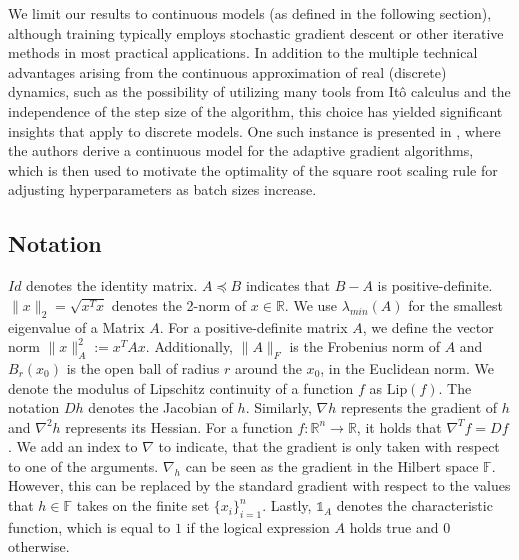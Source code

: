 \documentclass[10pt]{article} %
\newcommand{\R}{\mathbb{R}}
\newcommand{\bF}{\mathbb{F}}
\newcommand{\bR}{\mathbb{R}}
\begin{document}
We limit our results to continuous models (as defined in the following section), although training typically employs stochastic gradient descent or other iterative methods in most practical applications. In addition to the multiple technical advantages arising from the continuous approximation of real (discrete) dynamics, such as the possibility of utilizing many tools from Itô calculus and the independence of the step size of the algorithm, this choice has yielded significant insights that apply to discrete models. One such instance is presented in \citet{malladi2024sdesscalingrulesadaptive}, where the authors derive a continuous model for the adaptive gradient algorithms, which is then used to motivate the optimality of the square root scaling rule for adjusting hyperparameters as batch sizes increase.

\subsection{Notation}
$Id$ denotes the identity matrix. $A\preceq B$ indicates that $B-A$ is positive-definite. $\|x\|_2=\sqrt{x^Tx}$ denotes the 2-norm of $x\in\R$. We use $\lambda_{min}(A)$ for the smallest eigenvalue of a Matrix $A$. For a positive-definite matrix $A$, we define the vector norm $\|x\|_A^2:=x^TAx$. Additionally, $\|A\|_F$ is the Frobenius norm of $A$ and $B_r(x_0)$ is the open ball of radius $r$ around the $x_0$, in the Euclidean norm. We denote the modulus of Lipschitz continuity of a function $f$ as $\mathrm{Lip}(f)$. The notation $Dh$ denotes the Jacobian of $h$. Similarly, $\nabla h$ represents the gradient of $h$ and $\nabla^2 h$ represents its Hessian. For a function $f:\bR^n\rightarrow \bR$, it holds that $\nabla^Tf=Df$. We add an index to $\nabla$ to indicate, that the gradient is only taken with respect to one of the arguments. $\nabla_h$ can be seen as the gradient in the Hilbert space $\bF$. However, this can be replaced by the standard gradient with respect to the values that $h\in\bF$ takes on the finite set $\{x_i\}_{i=1}^n$. Lastly, $\mathds{1}_A$ denotes the characteristic function, which is equal to $1$ if the logical expression $A$ holds true and $0$ otherwise.
\end{document}
